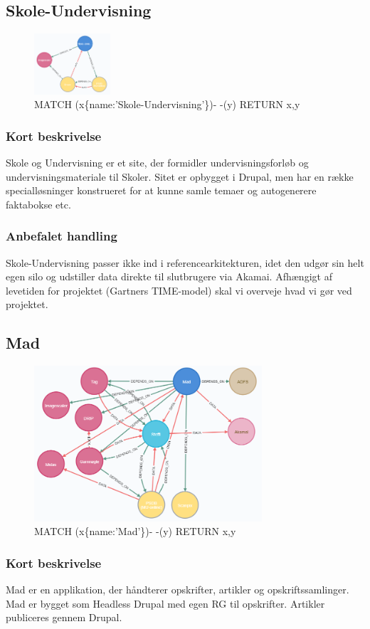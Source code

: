 \documentclass{article}
\begin{document}
\subsection{Skole-Undervisning}
\begin{figure}[h]
\includegraphics[width=80pt]{Skole-Undervisning.PNG}
\caption{MATCH (x\{name:'Skole-Undervisning'\})- -(y) RETURN x,y}
\end{figure}
\subsubsection{Kort beskrivelse}
Skole og Undervisning er et site, der formidler undervisningsforløb og undervisningsmateriale til Skoler.  Sitet er opbygget i Drupal, men har en række specialløsninger konstrueret for at kunne samle temaer og autogenerere faktabokse etc. 
\subsubsection{Anbefalet handling}
Skole-Undervisning passer ikke ind i referencearkitekturen, idet den udgør sin helt egen silo og udstiller data direkte til slutbrugere via Akamai. 
Afhængigt af levetiden for projektet (Gartners TIME-model) skal vi overveje hvad vi gør ved projektet.


\subsection{Mad}
\begin{figure}[h]
\includegraphics[width=240pt]{Mad.PNG}
\caption{MATCH (x\{name:'Mad'\})- -(y) RETURN x,y}
\end{figure}
\subsubsection{Kort beskrivelse}
Mad er en applikation, der håndterer opskrifter, artikler og opskriftssamlinger. Mad er bygget som Headless Drupal med egen RG til opskrifter. Artikler publiceres gennem Drupal. 
\end{document}
